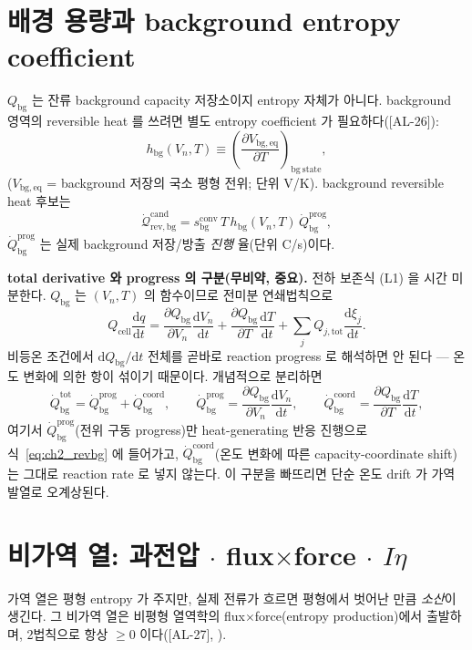 \documentclass[11pt,a4paper]{article}
\newcommand{\dd}{\mathrm{d}}
\newcommand{\eq}{\mathrm{eq}}
\newcommand{\bg}{\mathrm{bg}}
\newcommand{\cell}{\mathrm{cell}}
\newcommand{\tot}{\mathrm{tot}}
\newcommand{\rev}{\mathrm{rev}}
\newcommand{\cand}{\mathrm{cand}}
\newcommand{\conv}{\mathrm{conv}}
\newcommand{\prog}{\mathrm{prog}}
\newcommand{\coord}{\mathrm{coord}}
\newcommand{\AL}[1]{\textsf{[AL-#1]}}
\begin{document}
\section{배경 용량과 background entropy coefficient}\label{sec:ch2_bg}
$Q_\bg$ 는 잔류 background capacity 저장소이지 entropy 자체가 아니다. background 영역의 reversible heat 를
쓰려면 별도 entropy coefficient 가 필요하다(\AL{26}):
\begin{equation}
h_\bg(V_n,T)\equiv\left(\frac{\partial V_{\bg,\eq}}{\partial T}\right)_{\mathrm{bg\ state}},
\label{eq:ch2_hbg}
\end{equation}
($V_{\bg,\eq}$ = background 저장의 국소 평형 전위; 단위 V/K). background reversible heat 후보는
\begin{equation}
\dot{\mathcal Q}_{\rev,\bg}^{\cand}=s_\bg^{\conv}\,T\,h_\bg(V_n,T)\,\dot Q_\bg^{\prog},
\label{eq:ch2_revbg}
\end{equation}
$\dot Q_\bg^{\prog}$ 는 실제 background 저장/방출 \emph{진행} 율(단위 C/s)이다.

\textbf{total derivative 와 progress 의 구분(무비약, 중요).} 전하 보존식 (L1) 을 시간 미분한다. $Q_\bg$ 는
$(V_n,T)$ 의 함수이므로 전미분 연쇄법칙으로
\begin{equation}
Q_\cell\frac{\dd q}{\dd t}=\frac{\partial Q_\bg}{\partial V_n}\frac{\dd V_n}{\dd t}+\frac{\partial Q_\bg}{\partial T}\frac{\dd T}{\dd t}
+\sum_jQ_{j,\tot}\frac{\dd\xi_j}{\dd t}.
\label{eq:ch2_dQdt}
\end{equation}
비등온 조건에서 $\dd Q_\bg/\dd t$ 전체를 곧바로 reaction progress 로 해석하면 안 된다 — 온도 변화에 의한 항이
섞이기 때문이다. 개념적으로 분리하면
\begin{equation}
\dot Q_\bg^{\mathrm{tot}}=\dot Q_\bg^{\prog}+\dot Q_\bg^{\coord},\qquad
\dot Q_\bg^{\prog}=\frac{\partial Q_\bg}{\partial V_n}\frac{\dd V_n}{\dd t},\qquad
\dot Q_\bg^{\coord}=\frac{\partial Q_\bg}{\partial T}\frac{\dd T}{\dd t},
\label{eq:ch2_bgsplit}
\end{equation}
여기서 $\dot Q_\bg^{\prog}$(전위 구동 progress)만 heat-generating 반응 진행으로 식~\eqref{eq:ch2_revbg} 에
들어가고, $\dot Q_\bg^{\coord}$(온도 변화에 따른 capacity-coordinate shift)는 그대로 reaction rate 로 넣지
않는다. 이 구분을 빠뜨리면 단순 온도 drift 가 가역 발열로 오계상된다.

\section{비가역 열: 과전압 $\cdot$ flux$\times$force $\cdot$ $I\eta$}\label{sec:ch2_irr}
가역 열은 평형 entropy 가 주지만, 실제 전류가 흐르면 평형에서 벗어난 만큼 \emph{소산}이 생긴다. 그 비가역 열은
비평형 열역학의 flux$\times$force(entropy production)에서 출발하며, 2법칙으로 항상 $\ge0$ 이다(\AL{27},
\cite{degrootmazur1962,onsager1931}).
\end{document}
